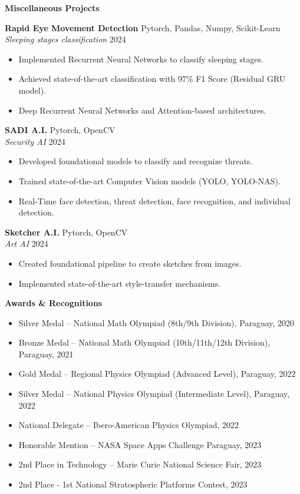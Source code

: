 \documentclass[11pt]{article}
\begin{document}
\begin{center}
    \textbf{Miscellaneous Projects}
\end{center}

\textbf{Rapid Eye Movement Detection} \hfill Pytorch, Pandas, Numpy, Scikit-Learn \\
\textit{Sleeping stages classification} \hfill 2024
\begin{itemize}[noitemsep]
    \item Implemented Recurrent Neural Networks to classify sleeping stages.
    \item Achieved state-of-the-art classification with 97\% F1 Score (Residual GRU model).
    \item Deep Recurrent Neural Networks and Attention-based architectures.
\end{itemize}

\textbf{SADI A.I.} \hfill Pytorch, OpenCV \\
\textit{Security AI} \hfill 2024
\begin{itemize}[noitemsep]
    \item Developed foundational models to classify and recognize threats.
    \item Trained state-of-the-art Computer Vision models (YOLO, YOLO-NAS).
    \item Real-Time face detection, threat detection, face recognition, and individual detection.
\end{itemize}

\textbf{Sketcher A.I.} \hfill Pytorch, OpenCV \\
\textit{Art AI} \hfill 2024
\begin{itemize}[noitemsep]
    \item Created foundational pipeline to create sketches from images.
    \item Implemented state-of-the-art style-transfer mechanisms.
\end{itemize}

\begin{center}
    \textbf{Awards \& Recognitions}
\end{center}

\begin{itemize}[noitemsep]
    \item Silver Medal – National Math Olympiad (8th/9th Division), Paraguay, 2020
    \item Bronze Medal – National Math Olympiad (10th/11th/12th Division), Paraguay, 2021
    \item Gold Medal – Regional Physics Olympiad (Advanced Level), Paraguay, 2022
    \item Silver Medal – National Physics Olympiad (Intermediate Level), Paraguay, 2022
    \item National Delegate – Ibero-American Physics Olympiad, 2022
    \item Honorable Mention – NASA Space Apps Challenge Paraguay, 2023
    \item 2nd Place in Technology – Marie Curie National Science Fair, 2023
    \item 2nd Place - 1st National Stratospheric Platforms Contest, 2023
\end{itemize}
\end{document}
